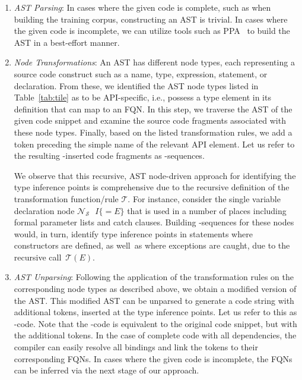 \begin{enumerate}
    \item \textit{AST Parsing}: In cases where the given code is complete, such as when building the training corpus, constructing an AST is trivial. In cases where the given code is incomplete, we can utilize tools such as PPA~\cite{dagenais-oopsla08} to build the AST in a best-effort manner. 

    \item \textit{Node Transformations}: An AST has different node types, each representing a source code construct such as a name, type, expression, statement, or declaration. From these, we identified the AST node types listed in Table~\ref{tab:tile} as to be API-specific, i.e., possess a type element in its definition that can map to an FQN. In this step, we traverse the AST of the given code snippet and examine the source code fragments associated with these node types. Finally, based on the listed transformation rules, we add a \code{[blank]} token preceding the simple name of the relevant API element. Let us refer to the resulting \code{[blank]}-inserted code fragments as \code{[blank]}-sequences.

    We observe that this recursive, AST node-driven approach for identifying the type inference points is comprehensive due to the recursive definition of the transformation function/rule $\mathcal{T}$. For instance, consider the single variable declaration node $\mathcal{N}_\mathcal{S}\text{ }I \{=E\}$ that is used in a number of places including formal parameter lists and catch clauses. Building \code{[blank]}-sequences for these nodes would, in turn, identify type inference points in statements where constructors are defined, as well~as where exceptions are caught, due to the recursive call~$\mathcal{T}(E)$.

    \item \textit{AST Unparsing}: Following the application of the transformation rules on the corresponding node types as described above, we obtain a modified version of the AST. This modified AST can be unparsed to generate a code string with additional \code{[blank]} tokens, inserted at the type inference points. Let us refer to this as \code{[blank]}-code.
    Note that the \code{[blank]}-code is equivalent to the original code snippet, but with the additional \code{[blank]} tokens.
    In the case of complete code with all dependencies, the compiler can easily resolve all bindings and link the \code{[blank]} tokens to their corresponding FQNs. In cases where the given code is incomplete, the FQNs can be inferred via the next stage of our approach.
\end{enumerate}  


